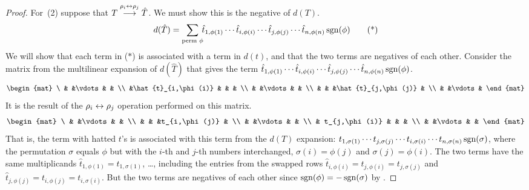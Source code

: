 \begin{proof}
For~(2) suppose that 
\( T\;\smash[b]{\mathrel{ \mathop{\longrightarrow}\limits^{\rho_i\leftrightarrow\rho_j\mathstrut}_{ \begin{subarray}{l} \relax \end{subarray}}}}\;\hat{T} \).
We must show this is the negative of $d(T)$.
\begin{equation*}
  d(\hat{T})=
  \sum_{\text{perm\ }\phi}\!\!
    \hat{t}_{1,\phi(1)}
    \cdots\hat{t}_{i,\phi(i)}
    \cdots\hat{t}_{j,\phi(j)}
    \cdots \hat{t}_{n,\phi(n)}
                                 \operatorname{sgn}(\phi)
    \tag{*}
\end{equation*}
We will show that each term in ($*$) is associated with a term in $d(t)$, 
and that the two terms are negatives of each other.
Consider the matrix from the multilinear expansion 
of $d(\hat{T})$ that gives the term  
    $\hat{t}_{1,\phi(1)}
    \cdots\hat{t}_{i,\phi(i)}
    \cdots\hat{t}_{j,\phi(j)}
    \cdots \hat{t}_{n,\phi(n)}
                                 \operatorname{sgn}(\phi)$.
\begin{equation*}
  \begin{mat}
     \ &                  &\vdots &               &     \\
       &\hat{t}_{i,\phi(i)}  &       &               &    \\
       &                &\vdots &                 &  \\
       &                &       &\hat{t}_{j,\phi(j)} &  \\
       &                &\vdots                   &
  \end{mat}
\end{equation*}
It is the result of the $\rho_i\leftrightarrow\rho_j$ operation performed on this
matrix.
\begin{equation*}
  \begin{mat}
       \ &              &\vdots &           &        \\
         &              &       &t_{i,\phi(j)} &  \\
         &              &\vdots &           &       \\
         &  t_{j,\phi(i)}  &       &          &        \\
         &              &\vdots &          &
  \end{mat}
\end{equation*}
That is, the term with hatted $t$'s is associated with 
this term from the $d(T)$ expansion:
 \(    t_{1,\sigma(1)}
       \cdots t_{j,\sigma(j)}
       \cdots t_{i,\sigma(i)}
       \cdots t_{n,\sigma(n)} \operatorname{sgn}(\sigma)
       \), where the permutation
\( \sigma \) 
equals \( \phi \) but with the
\( i \)-th and \( j \)-th numbers interchanged,
\( \sigma(i)=\phi(j) \) and \( \sigma(j)=\phi(i) \).
The two terms have the same multiplicands
$\hat{t}_{1,\phi(1)}=t_{1,\sigma(1)}$, \ldots, 
including the entries from the swapped rows
$\hat{t}_{i,\phi(i)}=t_{j,\phi(i)}=t_{j,\sigma(j)}$
and $\hat{t}_{j,\phi(j)}=t_{i,\phi(j)}=t_{i,\sigma(i)}$. 
But the two terms are negatives of each other
since \( \operatorname{sgn}(\phi)=-\operatorname{sgn}(\sigma) \) by .


\end{proof}
